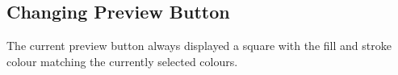 \subsection{Changing Preview Button}
The current preview button always displayed a square with the fill and stroke colour matching the currently selected colours.